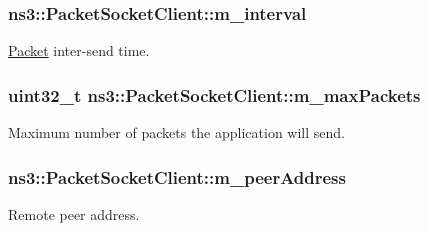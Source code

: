 \subsubsection[{\texorpdfstring{m\+\_\+interval}{m_interval}}]{ ns3\+::\+Packet\+Socket\+Client\+::m\+\_\+interval\hspace{0.3cm}{\ttfamily [private]}}\hypertarget{classns3_1_1PacketSocketClient_afb41dce3dd3ac9e9cf003bf6cac01cdc}{}\label{classns3_1_1PacketSocketClient_afb41dce3dd3ac9e9cf003bf6cac01cdc}


\hyperlink{classns3_1_1Packet}{Packet} inter-\/send time. 

\subsubsection[{\texorpdfstring{m\+\_\+max\+Packets}{m_maxPackets}}]{\setlength{\rightskip}{0pt plus 5cm}uint32\+\_\+t ns3\+::\+Packet\+Socket\+Client\+::m\+\_\+max\+Packets\hspace{0.3cm}{\ttfamily [private]}}\hypertarget{classns3_1_1PacketSocketClient_a817894ce70a1b601173d05024b75fe34}{}\label{classns3_1_1PacketSocketClient_a817894ce70a1b601173d05024b75fe34}


Maximum number of packets the application will send. 

\subsubsection[{\texorpdfstring{m\+\_\+peer\+Address}{m_peerAddress}}]{ ns3\+::\+Packet\+Socket\+Client\+::m\+\_\+peer\+Address\hspace{0.3cm}{\ttfamily [private]}}\hypertarget{classns3_1_1PacketSocketClient_af69b407a03a7a42baa902e622b07f6cf}{}\label{classns3_1_1PacketSocketClient_af69b407a03a7a42baa902e622b07f6cf}


Remote peer address. 

